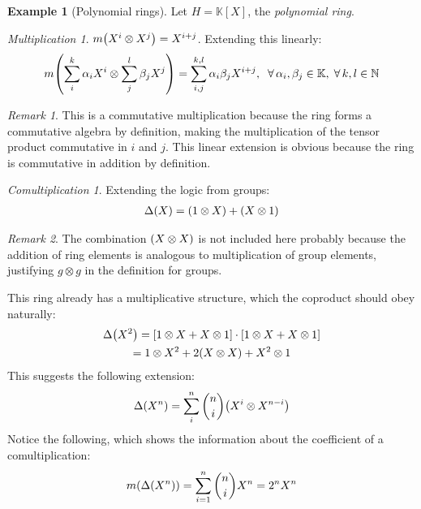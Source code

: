 \documentclass{article}
\theoremstyle{definition}
\newtheorem{Example}{Example}
\theoremstyle{remark}
\newtheorem*{Remark*}{Remark}
\theoremstyle{underline}
\newtheorem*{Multiplication*}{Multiplication}
\theoremstyle{underline}
\newtheorem*{Comultiplication*}{Comultiplication}
\begin{document}
\begin{Example}[Polynomial rings]
Let $H = \mathbb{K}[X]$, the \emph{polynomial ring}.

\begin{Multiplication*}
$m\pqty{X^i \otimes X^j} = X^{i+j}$. Extending this linearly:
\begin{gather*}
	m\pqty{\sum_i^k \alpha_i X^i \otimes \sum_j^l \beta_j X^j} = \sum_{i,j}^{k,l} \alpha_i \beta_j X^{i+j},\;\; \forall\,\alpha_i,\beta_j \in \mathbb K,\; \forall\,	k,l \in \mathbb N
\end{gather*}
\end{Multiplication*}

\begin{Remark*}
This is a commutative multiplication because the ring forms a commutative algebra by definition, making the multiplication of the tensor product commutative in $i$ and $j$. This linear extension is obvious because the ring is commutative in addition by definition.
\end{Remark*}

\begin{Comultiplication*}
Extending the logic from groups:
\begin{gather*}
	\Delta\pqty{X} = \pqty{1 \otimes X} + \pqty{X \otimes 1}
\end{gather*}
\end{Comultiplication*}

\begin{Remark*}
The combination $\pqty{X \otimes X}$ is not included here probably because the addition of ring elements is analogous to multiplication of group elements, justifying $g \otimes g$ in the definition for groups. \\
\end{Remark*}

This ring already has a multiplicative structure, which the coproduct should obey naturally:
\begin{gather*}
	\Delta\pqty{X^2} = \bqty{1 \otimes X + X \otimes 1} \cdot \bqty{1 \otimes X + X \otimes 1} \\
	= 1 \otimes X^2 + 2\pqty{X\otimes X} + X^2 \otimes 1 
\end{gather*}
This suggests the following extension:
\begin{gather*}
	\Delta\pqty{X^{n}} = \sum_{i}^{n} \binom{n}{i}\pqty{X^{i} \otimes X^{n-i}} 
\end{gather*}
Notice the following, which shows the information about the coefficient of a comultiplication:
\begin{gather*}
	m\pqty{\Delta\pqty{X^n}} = \sum_{i=1}^{n} \binom{n}{i}X^n =  2^nX^n
\end{gather*}

\end{Example}
\end{document}
